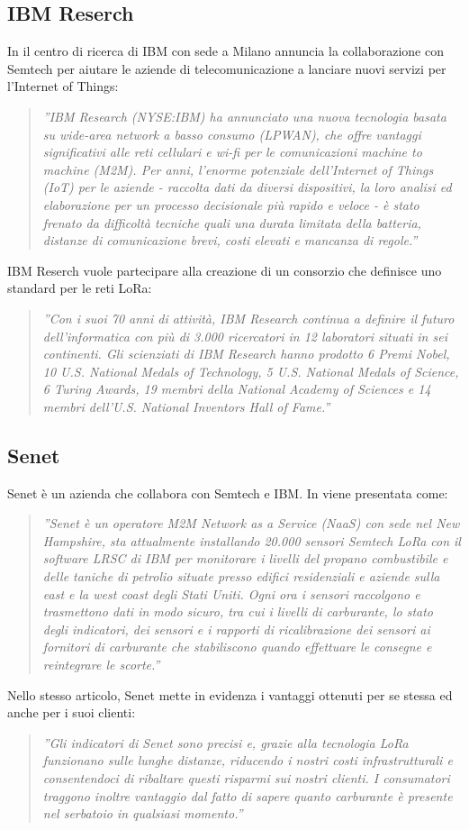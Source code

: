 \documentclass[a4paper]{report} %
\begin{document}
\subsection{IBM Reserch}
In \cite{art:rif.26} il centro di ricerca di IBM con sede a Milano annuncia la collaborazione con Semtech per aiutare le aziende di telecomunicazione a lanciare nuovi servizi per l’Internet of Things:
\begin{quote}
	\textit{''IBM Research (NYSE:IBM) ha annunciato una nuova tecnologia basata su wide-area network a basso consumo (LPWAN), che offre vantaggi significativi alle reti cellulari e wi-fi per le comunicazioni machine to machine (M2M).
	Per anni, l'enorme potenziale dell’Internet of Things (IoT) per le aziende - raccolta dati da diversi dispositivi, la loro analisi ed elaborazione per un processo decisionale più rapido e veloce - è stato frenato da difficoltà tecniche quali una durata limitata della batteria, distanze di comunicazione brevi, costi elevati e mancanza di regole.''}
\end{quote}
IBM Reserch vuole partecipare alla creazione di un consorzio che definisce uno standard per le reti LoRa:
\begin{quote}
	\textit{''Con i suoi 70 anni di attività, IBM Research continua a definire il futuro dell'informatica con più di 3.000 ricercatori in 12 laboratori situati in sei continenti. Gli scienziati di IBM Research hanno prodotto 6 Premi Nobel, 10 U.S. National Medals of Technology, 5 U.S. National Medals of Science, 6 Turing Awards, 19 membri della National Academy of Sciences e 14 membri dell'U.S. National Inventors Hall of Fame.''} 
\end{quote}

\subsection{Senet}
Senet è un azienda che collabora con Semtech e IBM. In \cite{art:rif.26} viene presentata come:
\begin{quote}
	\textit{''Senet è un operatore M2M Network as a Service (NaaS) con sede nel New Hampshire, sta attualmente installando 20.000 sensori Semtech LoRa con il software LRSC di IBM per monitorare i livelli del propano combustibile e delle taniche di petrolio situate presso edifici residenziali e aziende sulla east e la west coast degli Stati Uniti. Ogni ora i sensori raccolgono e trasmettono dati in modo sicuro, tra cui i livelli di carburante, lo stato degli indicatori, dei sensori e i rapporti di ricalibrazione dei sensori ai fornitori di carburante che stabiliscono quando effettuare le consegne e reintegrare le scorte.''}
\end{quote}
Nello stesso articolo, Senet mette in evidenza i vantaggi ottenuti per se stessa ed anche per i suoi clienti:
\begin{quote}
	\textit{''Gli indicatori di Senet sono precisi e, grazie alla tecnologia LoRa funzionano sulle lunghe distanze, riducendo i nostri costi infrastrutturali e consentendoci di ribaltare questi risparmi sui nostri clienti. I consumatori traggono inoltre vantaggio dal fatto di sapere quanto carburante è presente nel serbatoio in qualsiasi momento.''}
\end{quote}
\end{document}
